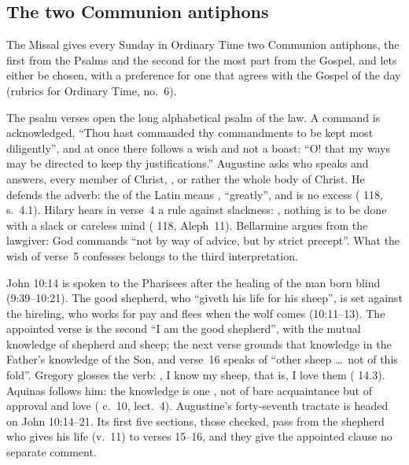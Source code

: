 \subsection{The two Communion antiphons}

The Missal gives every Sunday in Ordinary Time two Communion antiphons, the
first from the Psalms and the second for the most part from the Gospel, and
lets either be chosen, with a preference for one that agrees with the Gospel of
the day (rubrics for Ordinary Time, no.~6).

The psalm verses open the long alphabetical psalm of the law. A command is
acknowledged, ``Thou hast commanded thy commandments to be kept most
diligently'', and at once there follows a wish and not a boast: ``O! that my
ways may be directed to keep thy justifications.'' Augustine asks who speaks
and answers, every member of Christ, , or rather the whole body of Christ. He defends the adverb: the
 of the Latin means , ``greatly'', and is no excess
( 118, s.~4.1). Hilary hears in verse~4 a rule
against slackness: , nothing is to be done with a slack or careless mind
( 118, Aleph~11). Bellarmine argues from the
lawgiver: God commands ``not by way of advice, but by strict precept''. What
the wish of verse~5 confesses belongs to the third interpretation.

John 10:14 is spoken to the Pharisees after the healing of the man born blind
(9:39--10:21). The good shepherd, who ``giveth his life for his sheep'', is
set against the hireling, who works for pay and flees when the wolf comes
(10:11--13). The appointed verse is the second ``I am the good shepherd'',
with the mutual knowledge of shepherd and sheep; the next verse grounds that
knowledge in the Father's knowledge of the Son, and verse~16 speaks of ``other
sheep \ldots\ not of this fold''. Gregory glosses the verb: , I know my sheep, that is, I love them
( 14.3). Aquinas follows him: the knowledge is one
, not of bare
acquaintance but of approval and love ( c.~10, lect.~4).
Augustine's forty-seventh tractate is headed on John 10:14--21. Its first
five sections, those checked, pass from the shepherd who gives his
life (v.~11) to verses 15--16, and they give the appointed clause no separate
comment.

